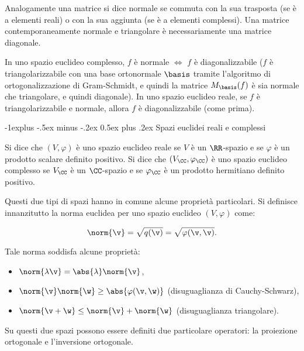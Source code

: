 \documentclass[10pt,landscape]{article}
\makeatletter
\renewcommand{\subsection}{\@startsection{subsection}{2}{0mm}%
	{-1explus -.5ex minus -.2ex}%
	{0.5ex plus .2ex}%
	{\normalfont\normalsize\bfseries}}
\makeatother
\begin{document}
\begin{multicols}{3}
		Analogamente una matrice si dice
		normale se commuta con la sua trasposta (se è a elementi reali) o con la sua aggiunta (se è a elementi complessi). Una matrice contemporaneamente
		normale e triangolare è necessariamente una matrice
		diagonale. \\ \vskip 0.05in
		
		In uno spazio euclideo complesso, $f$ è normale $\iff$ $f$ è diagonalizzabile ($f$ è triangolarizzabile con una base ortonormale $\basis$ tramite
		l'algoritmo di ortogonalizzazione di Gram-Schmidt, e quindi la matrice $M_\basis(f)$ è sia normale che
		triangolare, e quindi diagonale). In uno spazio
		euclideo reale, se $f$ è triangolarizzabile e
		normale, allora $f$ è diagonalizzabile (come prima).
		
		\subsection{Spazi euclidei reali e complessi}
		
		Si dice che $(V, \varphi)$ è uno spazio euclideo reale se $V$ è un $\RR$-spazio e se
		$\varphi$ è un prodotto scalare definito positivo. Si dice che $(V_\CC, \varphi_\CC)$ è uno spazio euclideo complesso se $V_\CC$ è un $\CC$-spazio e se $\varphi_\CC$ è un
		prodotto hermitiano definito positivo.
		
		Questi due tipi di spazi hanno in comune alcune proprietà particolari. Si definisce
		innanzitutto la norma euclidea per uno spazio euclideo $(V, \varphi)$ come:
		
		\[ \norm{\v} = \sqrt{q(\v)} = \sqrt{\varphi(\v, \v)}. \]
		
		Tale norma soddisfa alcune proprietà:
		
		\begin{itemize}
			\item $\norm{\lambda \v} = \abs{\lambda} \norm{\v}$,
			\item $\norm{\v} \norm{\w} \geq \abs{\varphi(\v, \w)}$ (disuguaglianza di Cauchy-Schwarz),
			\item $\norm{\v + \w} \leq \norm{\v} + \norm{\w}$ (disuguaglianza triangolare).
		\end{itemize}
		
		Su questi due spazi possono essere definiti due particolare operatori: la
		proiezione ortogonale e l'inversione ortogonale.
		

\end{multicols}
\end{document}
